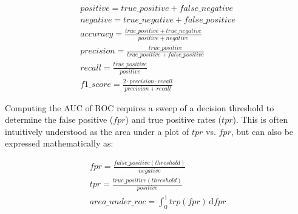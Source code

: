 \begin{gather}
\label{EquationFirstBinaryMetric}
positive = true\_positive + false\_negative \\
negative = true\_negative + false\_positive \\
accuracy = \frac{true\_positive + true\_negative}{positive + negative}\\
precision = \frac{true\_positive}{true\_positive + false\_positive}\\
recall = \frac{true\_positive}{positive}\\
f1\_score = \frac{2 \cdot precision \cdot recall}{precision + recall}
\end{gather}

Computing the \ac{AUC} of \ac{ROC} requires a sweep of a decision threshold to determine the false positive ($fpr$) and true positive rates ($tpr$). This is often intuitively understood as the area under a plot of $tpr$ vs. $fpr$, but can also be expressed mathematically as:

\begin{gather}
fpr=\frac{false\_positive(threshold)}{negative} \\
tpr=\frac{true\_positive(threshold)}{positive} \\
\label{EquationLastBinaryMetric}
area\_under\_roc=\int_0^1 trp(fpr)\,\mathrm{d}fpr
\end{gather}

